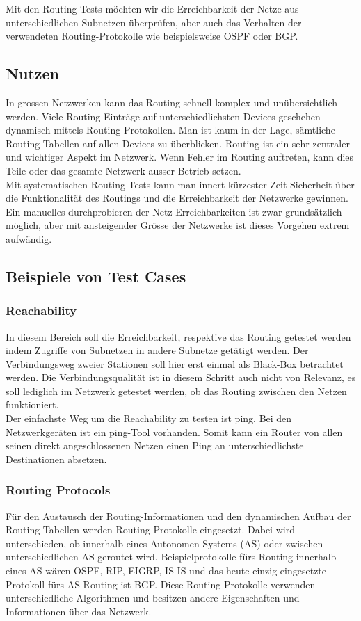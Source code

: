 \documentclass[a4,12pt]{scrartcl}
\begin{document}
\noindent Mit den Routing Tests möchten wir die Erreichbarkeit der Netze aus unterschiedlichen Subnetzen überprüfen, aber auch das Verhalten der verwendeten Routing-Protokolle wie beispielsweise OSPF oder BGP. 
\subsection{Nutzen}
In grossen Netzwerken kann das Routing schnell komplex und unübersichtlich werden. Viele Routing Einträge auf unterschiedlichsten Devices geschehen dynamisch mittels Routing Protokollen. Man ist kaum in der Lage, sämtliche Routing-Tabellen auf allen Devices zu überblicken. Routing ist ein sehr zentraler und wichtiger Aspekt im Netzwerk. Wenn Fehler im Routing auftreten, kann dies Teile oder das gesamte Netzwerk ausser Betrieb setzen.\\

\noindent Mit systematischen Routing Tests kann man innert kürzester Zeit Sicherheit über die Funktionalität des Routings und die Erreichbarkeit der Netzwerke gewinnen. Ein manuelles durchprobieren der Netz-Erreichbarkeiten ist zwar grundsätzlich möglich, aber mit ansteigender Grösse der Netzwerke ist dieses Vorgehen extrem aufwändig. 
\subsection{Beispiele von Test Cases}
\subsubsection{Reachability}
In diesem Bereich soll die Erreichbarkeit, respektive das Routing getestet werden indem Zugriffe von Subnetzen in andere Subnetze getätigt werden. Der Verbindungsweg zweier Stationen soll hier erst einmal als Black-Box betrachtet werden. Die Verbindungsqualität ist in diesem Schritt auch nicht von Relevanz, es soll lediglich im Netzwerk getestet werden, ob das Routing zwischen den Netzen funktioniert.\\

\noindent Der einfachste Weg um die Reachability zu testen ist ping. Bei den Netzwerkgeräten ist ein ping-Tool vorhanden. Somit kann ein Router von allen seinen direkt angeschlossenen Netzen einen Ping an unterschiedlichste Destinationen absetzen.
\subsubsection{Routing Protocols}
Für den Austausch der Routing-Informationen und den dynamischen Aufbau der Routing Tabellen werden Routing Protokolle eingesetzt. Dabei wird unterschieden, ob innerhalb eines Autonomen Systems (AS) oder zwischen unterschiedlichen AS geroutet wird. Beispielprotokolle fürs Routing innerhalb eines AS wären OSPF, RIP, EIGRP, IS-IS und das heute einzig eingesetzte Protokoll fürs AS Routing ist BGP. Diese Routing-Protokolle verwenden unterschiedliche Algorithmen und besitzen andere Eigenschaften und Informationen über das Netzwerk.\\
\end{document}
